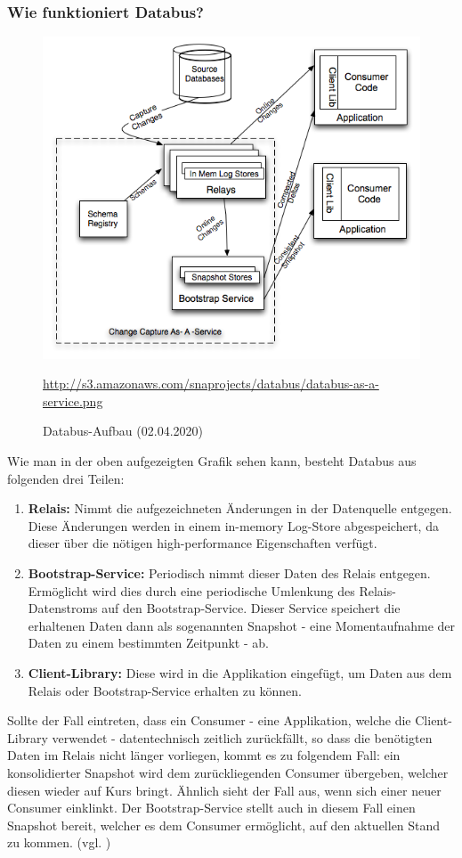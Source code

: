 \subsubsection{Wie funktioniert Databus?}
\begin{figure}[H]
    \centering
    \includegraphics[scale=0.4]{images/databus-as-a-service.png}
    \caption{Databus-Aufbau (02.04.2020)}
    \label{img:}
    \url{http://s3.amazonaws.com/snaprojects/databus/databus-as-a-service.png}
\end{figure}
Wie man in der oben aufgezeigten Grafik sehen kann, besteht Databus aus folgenden drei Teilen: 
\begin{enumerate}
  \item \textbf{Relais:} Nimmt die aufgezeichneten Änderungen in der Datenquelle entgegen. Diese Änderungen werden in einem in-memory Log-Store abgespeichert, da dieser über die nötigen high-performance Eigenschaften verfügt.
  \item \textbf{Bootstrap-Service:} Periodisch nimmt dieser Daten des Relais entgegen. Ermöglicht wird dies durch eine periodische Umlenkung des Relais-Datenstroms auf den Bootstrap-Service. Dieser Service speichert die erhaltenen Daten dann als sogenannten Snapshot - eine Momentaufnahme der Daten zu einem bestimmten Zeitpunkt - ab.
  \item \textbf{Client-Library:} Diese wird in die Applikation eingefügt, um Daten aus dem Relais oder Bootstrap-Service erhalten zu können.
\end{enumerate}
Sollte der Fall eintreten, dass ein Consumer - eine Applikation, welche die Client-Library verwendet - datentechnisch zeitlich zurückfällt, so dass die benötigten Daten im Relais nicht länger vorliegen, kommt es zu folgendem Fall: ein konsolidierter Snapshot wird dem zurückliegenden Consumer übergeben, welcher diesen wieder auf Kurs bringt. Ähnlich sieht der Fall aus, wenn sich einer neuer Consumer einklinkt. Der Bootstrap-Service stellt auch in diesem Fall einen Snapshot bereit, welcher es dem Consumer ermöglicht, auf den aktuellen Stand zu kommen.
(vgl. \cite{Databus-Open-Sourcing})
